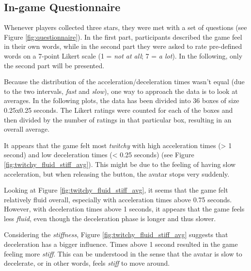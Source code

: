 
\subsection{In-game Questionnaire}

Whenever players collected three stars, they were met with a set of questions (see Figure \ref{fig:questionnaire}). In the first part, participants described the game feel in their own words, while in the second part they were asked to rate pre-defined words on a 7-point Likert scale (1 = \textit{not at all}; 7 = \textit{a lot}). In the following, only the second part will be presented.

Because the distribution of the acceleration/deceleration times wasn't equal (due to the two intervals, \textit{fast} and \textit{slow}), one way to approach the data is to look at averages. In the following plots, the data has been divided into 36 boxes of size 0.25x0.25 seconds. The Likert ratings were counted for each of the boxes and then divided by the number of ratings in that particular box, resulting in an overall average.

It appears that the game felt most \textit{twitchy} with high acceleration times (> 1 second) and low deceleration times (< 0.25 seconds) (see Figure \ref{fig:twitchy_fluid_stiff_avg}). This might be due to the feeling of having slow acceleration, but when releasing the button, the avatar stops very suddenly.

Looking at Figure \ref{fig:twitchy_fluid_stiff_avg}, it seems that the game felt relatively fluid overall, especially with acceleration times above 0.75 seconds. However, with deceleration times above 1 seconds, it appears that the game feels less \textit{fluid}, even though the deceleration phase is longer and thus slower.

Considering the \textit{stiffness}, Figure \ref{fig:twitchy_fluid_stiff_avg} suggests that deceleration has a bigger influence. Times above 1 second resulted in the game feeling more \textit{stiff}. This can be understood in the sense that the avatar is slow to decelerate, or in other words, feels \textit{stiff} to move around.

